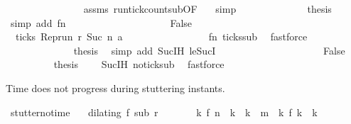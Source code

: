 \begin{isabellebody}
\ \ \ \ \ \ \ \ \ \ \ \ \ \ \isamarkupfalse%
\ assms{\isacharparenleft}{}{\isacharparenright}\ run{\isacharunderscore}tick{\isacharunderscore}count{\isacharunderscore}sub{\isacharbrackleft}OF\ {\isacharasterisk}{\isacharbrackright}\ \isamarkupfalse%
\ simp\isanewline
\ \ \ \ \ \ \ \ \ \ \ \ \isamarkupfalse%
\ {\isacharquery}thesis\ \isamarkupfalse%
\ {\isacharparenleft}simp\ add{\isacharcolon}\ fn{}{\isacharparenright}\isanewline
\ \ \ \ \ \ \ \ \isamarkupfalse%
\isanewline
\ \ \ \ \ \ \ \ \ \ \isamarkupfalse%
\ False\isanewline
\ \ \ \ \ \ \ \ \ \ \ \ \isamarkupfalse%
\ {\isacartoucheopen}{\isasymnot}\ ticks\ {\isacharparenleft}{\isacharparenleft}Rep{\isacharunderscore}run\ r{\isacharparenright}\ {\isacharparenleft}Suc\ n{\isacharprime}{\isacharparenright}\ a{\isacharparenright}{\isacartoucheclose}\isanewline
\ \ \ \ \ \ \ \ \ \ \ \ \ \ \isamarkupfalse%
\ {\isacharasterisk}\ fn{}\ ticks{\isacharunderscore}sub\ \isamarkupfalse%
\ fastforce\isanewline
\ \ \ \ \ \ \ \ \ \ \ \ \isamarkupfalse%
\ {\isacharquery}thesis\ \isamarkupfalse%
\ {\isacharparenleft}simp\ add{\isacharcolon}\ Suc{\isachardot}IH\ le{\isacharunderscore}SucI{\isacharparenright}\isanewline
\ \ \ \ \ \ \ \ \isamarkupfalse%
\isanewline
\ \ \ \ \isamarkupfalse%
\isanewline
\ \ \ \ \ \ \isamarkupfalse%
\ False\isanewline
\ \ \ \ \ \ \ \ \isamarkupfalse%
\ {\isacharquery}thesis\ \ \isamarkupfalse%
\ {\isacharasterisk}\ Suc{\isachardot}IH\ no{\isacharunderscore}tick{\isacharunderscore}sub\ \isamarkupfalse%
\ fastforce\isanewline
\ \ \ \ \isamarkupfalse%
\isanewline
\ \ \isamarkupfalse%
\isanewline
{}\isamarkupfalse%
%
\endisatagproof
{\isafoldproof}%
%
\isadelimproof
%
\endisadelimproof
%
\begin{isamarkuptext}%
Time does not progress during stuttering instants.%
\end{isamarkuptext}\isamarkuptrue%
\isamarkupfalse%
\ stutter{\isacharunderscore}no{\isacharunderscore}time{\isacharcolon}\isanewline
\ \ \ {\isacartoucheopen}dilating\ f\ sub\ r{\isacartoucheclose}\isanewline
\ \ \ \ \ \ \ {\isacartoucheopen}{\isasymAnd}k{\isachardot}\ f\ n\ {\isacharless}\ k\ {\isasymand}\ k\ {\isasymle}\ m\ {\isasymLongrightarrow}\ {\isacharparenleft}{\isasymnexists}k\ f\ k\ {\isacharequal}\ k{\isacharparenright}{\isacartoucheclose}\isanewline

\end{isabellebody}
